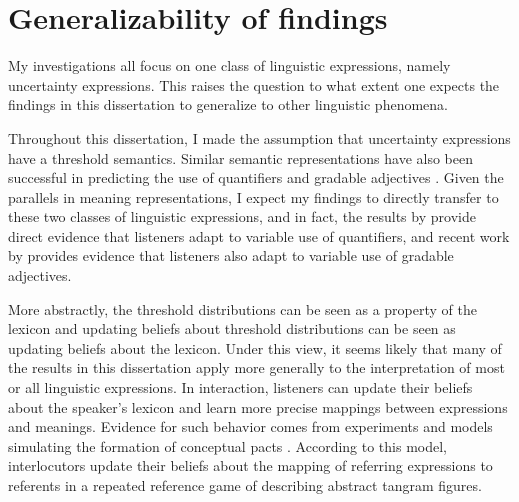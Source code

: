 \section{Generalizability of findings}

My investigations all focus on one class of linguistic expressions, namely uncertainty expressions. This raises the question
to what extent one expects the findings in this dissertation to generalize to other linguistic phenomena.

Throughout this dissertation, I made the assumption that uncertainty expressions have a threshold semantics. Similar semantic
representations have also been successful in predicting the use of quantifiers  and gradable adjectives . Given
the parallels in meaning representations, I expect my findings to directly transfer to these two classes of linguistic expressions, and in fact, 
the results by \textcite{Yildirim2016} provide direct evidence that listeners adapt to variable use of quantifiers, and recent work by \textcite{Xiang2020} 
provides evidence that listeners also adapt to variable use of gradable adjectives.

More abstractly, the threshold distributions can be seen as a property of the lexicon and updating beliefs about threshold distributions can be seen as
updating beliefs about the lexicon. Under this view, it seems likely that many of the results in this dissertation apply more generally to the interpretation of most or all linguistic expressions.
In interaction, listeners can update their beliefs about the speaker's lexicon and learn more precise mappings between expressions and meanings. Evidence for such behavior comes from  experiments and models simulating the formation of conceptual pacts \cite{Hawkins2017}. According to this model, interlocutors update their beliefs about the mapping of referring expressions
to referents in a repeated reference game of describing abstract tangram figures.

